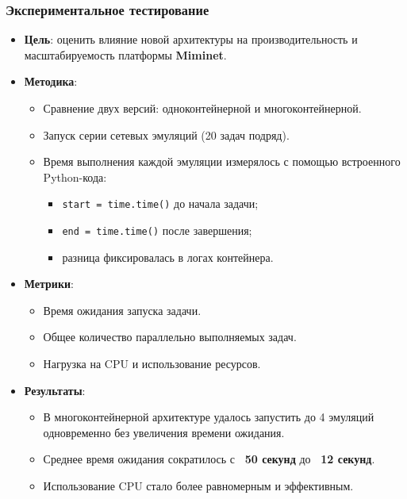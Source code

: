 \documentclass{beamer}
\begin{document}
\begin{frame}[fragile]
  \frametitle{Экспериментальное тестирование}
  \begin{itemize}
    \item \textbf{Цель}: оценить влияние новой архитектуры на производительность и масштабируемость платформы \textbf{Miminet}.
    \item \textbf{Методика}:
    \begin{itemize}
      \item Сравнение двух версий: одноконтейнерной и многоконтейнерной.
      \item Запуск серии сетевых эмуляций (20 задач подряд).
      \item Время выполнения каждой эмуляции измерялось с помощью встроенного Python-кода:
      \begin{itemize}
        \item \texttt{start = time.time()} до начала задачи;
        \item \texttt{end = time.time()} после завершения;
        \item разница фиксировалась в логах контейнера.
      \end{itemize}
    \end{itemize}

    \item \textbf{Метрики}:
    \begin{itemize}
      \item Время ожидания запуска задачи.
      \item Общее количество параллельно выполняемых задач.
      \item Нагрузка на CPU и использование ресурсов.
    \end{itemize}

    \item \textbf{Результаты}:
    \begin{itemize}
      \item В многоконтейнерной архитектуре удалось запустить до 4 эмуляций одновременно без увеличения времени ожидания.
      \item Среднее время ожидания сократилось с \textbf{~50 секунд} до \textbf{~12 секунд}.
      \item Использование CPU стало более равномерным и эффективным.
    \end{itemize}
  \end{itemize}
\end{frame}
\end{document}
